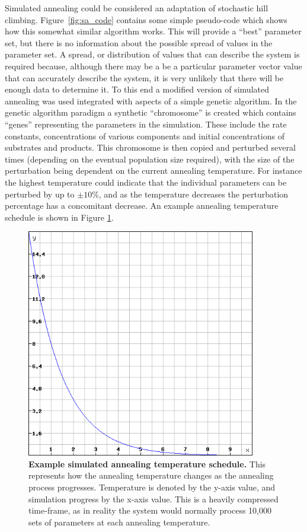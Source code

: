 Simulated annealing could be considered an adaptation of stochastic hill climbing. Figure~\ref{fig:sa_code} contains some simple pseudo-code which shows how this somewhat similar algorithm works. This will provide a ``best'' parameter set, but there is no information about the possible spread of values in the parameter set. A spread, or distribution of values that can describe the system is required because, although there may be a be a particular parameter vector value that can accurately describe the system, it is very unlikely that there will be enough data to determine it. To this end a modified version of simulated annealing was used integrated with aspects of a simple genetic algorithm. In the genetic algorithm paradigm a synthetic ``chromosome'' is created which contains ``genes'' representing the parameters in the simulation. These include the rate constants, concentrations of various components and initial concentrations of substrates and products. This chromosome is then copied and perturbed 
several times (depending on the eventual population size required), with the size of the perturbation being dependent on the current annealing temperature. For instance the highest temperature could indicate that the individual parameters can be perturbed by up to $\pm 10\%$, and as the temperature decreases the perturbation percentage has a concomitant decrease. An example annealing temperature schedule is shown in Figure \ref{fig:temperature}.
\begin{figure}[!ht]
	\begin{center}
		\includegraphics[height=10cm]{03-parameterestimationmethodologies/data/temperature.png}
	\caption[Example simulated annealing temperature schedule]{{\bf Example simulated annealing temperature schedule.} This represents how the annealing temperature changes as the annealing process progresses. Temperature is denoted by the y-axis value, and simulation progress by the x-axis value. This is a heavily compressed time-frame, as in reality the system would normally process 10,000 sets of parameters at each annealing temperature.
	\label{fig:temperature}}
	\end{center}
\end{figure}
